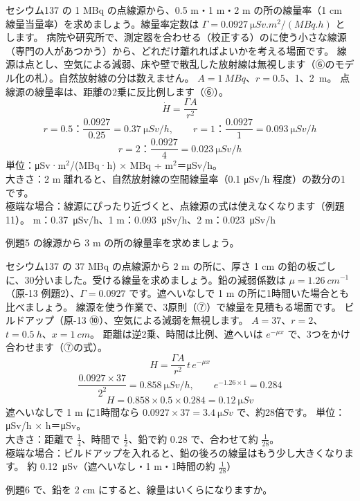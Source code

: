 \label{ph:原-14:ex5}
\begin{phreidai}[点線源からの距離と線量率]
セシウム137 の 1 MBq の点線源から、0.5 m・1 m・2 m の所の線量率（1 cm 線量当量率）を求めましょう。線量率定数は $\Gamma=\qty{0.0927}{\micro Sv.m^2/(MBq.h)}$ とします。
\phbamen
病院や研究所で、測定器を合わせる（校正する）のに使う小さな線源（専門の人があつかう）から、どれだけ離れればよいかを考える場面です。
\phmushi
線源は点とし、空気による減弱、床や壁で散乱した放射線は無視します（⑥のモデル化の札）。自然放射線の分は数えません。
\phzu
$A=\qty{1}{MBq}$、$r=0.5$、1、\qty{2}{m}。
\phriyu
点線源の線量率は、距離の2乗に反比例します（⑥）。
\phtateru
\[ \dot H=\frac{\Gamma A}{r^2} \]
\phtoku
\[ r=0.5\text{：}\frac{0.0927}{0.25}=\qty{0.37}{\micro Sv/h},\qquad r=1\text{：}\frac{0.0927}{1}=\qty{0.093}{\micro Sv/h} \]
\[ r=2\text{：}\frac{0.0927}{4}=\qty{0.023}{\micro Sv/h} \]
\phtashikame
単位：\si{\micro Sv}·m$^2$/(MBq·h) × MBq ÷ m$^2$＝\si{\micro Sv/h}。\\
大きさ：2 m 離れると、自然放射線の空間線量率（0.1 \si{\micro Sv/h} 程度）の数分の1です。\\
極端な場合：線源にぴったり近づくと、点線源の式は使えなくなります（例題11）。
 m：\qty{0.37}{\micro Sv/h}、1 m：\qty{0.093}{\micro Sv/h}、2 m：\qty{0.023}{\micro Sv/h}
\end{phreidai}
\begin{jibun}
例題5 の線源から 3 m の所の線量率を求めましょう。
\end{jibun}

\label{ph:原-14:ex6}
\begin{phreidai}[時間・距離・遮へいを全部使う]
セシウム137 の 37 MBq の点線源から 2 m の所に、厚さ 1 cm の鉛の板ごしに、30分いました。受ける線量を求めましょう。鉛の減弱係数は $\mu=\qty{1.26}{cm^{-1}}$（原-13 例題2）、$\Gamma=0.0927$ です。遮へいなしで 1 m の所に1時間いた場合とも比べましょう。
\phbamen
線源を使う作業で、3原則（⑦）で線量を見積もる場面です。
\phmushi
ビルドアップ（原-13 ⑩）、空気による減弱を無視します。
\phzu
$A=37$、$r=2$、$t=\qty{0.5}{h}$、$x=\qty{1}{cm}$。
\phriyu
距離は逆2乗、時間は比例、遮へいは $e^{-\mu x}$ で、3つをかけ合わせます（⑦の式）。
\phtateru
\[ H=\frac{\Gamma A}{r^2}\,t\,e^{-\mu x} \]
\phtoku
\[ \frac{0.0927\times37}{2^2}=\qty{0.858}{\micro Sv/h},\qquad e^{-1.26\times1}=0.284 \]
\[ H=0.858\times0.5\times0.284=\qty{0.12}{\micro Sv} \]
遮へいなしで 1 m に1時間なら $0.0927\times37=\qty{3.4}{\micro Sv}$ で、約28倍です。
\phtashikame
単位：\si{\micro Sv/h} × h＝\si{\micro Sv}。\\
大きさ：距離で $\tfrac14$、時間で $\tfrac12$、鉛で約 0.28 で、合わせて約 $\tfrac1{28}$。\\
極端な場合：ビルドアップを入れると、鉛の後ろの線量はもう少し大きくなります。
\kotae 約 \qty{0.12}{\micro Sv}（遮へいなし・1 m・1時間の約 $\tfrac1{28}$）
\end{phreidai}
\begin{jibun}
例題6 で、鉛を 2 cm にすると、線量はいくらになりますか。
\end{jibun}

